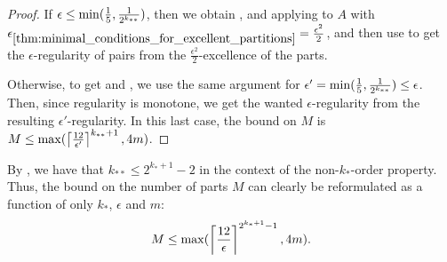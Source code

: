 \begin{theorem}
\begin{enumerate}
            \end{enumerate}
            \begin{proof}
                If $\epsilon \leq \min ( \frac{1}{5}, \frac{1}{2^{k_{**}}} )$, then we obtain ,
                 and  applying
                 to $A$ with
                $\epsilon_{\ref{thm:minimal_conditions_for_excellent_partitions}} = \frac{\epsilon^2}{2}$, and then use
                 to get the $\epsilon$-regularity of pairs from the $\frac{\epsilon^2}{2}$-excellence
                of the parts.

                Otherwise, to get  and ,
                we use the same argument for $\epsilon' = \min ( \frac{1}{5}, \frac{1}{2^{k_{**}}} ) \leq \epsilon$.
                Then, since regularity is monotone, we get the wanted $\epsilon$-regularity from the resulting $\epsilon'$-regularity.
                In this last case, the bound on $M$ is $M \leq \max ( \left\lceil \frac{12}{\epsilon'} \right\rceil^{k_{**}+1}, 4m )$.
            \end{proof}
        \end{theorem}

        \begin{remark}
            By , we have that $k_{**} \leq 2^{k_* + 1}-2$ in the context of the non-$k_*$-order
            property.
            Thus, the bound on the number of parts $M$ can clearly be reformulated as a function of only $k_*$, $\epsilon$ and $m$:
            \[
                M \leq \max ( \left\lceil \frac{12}{\epsilon} \right\rceil^{2^{k_* + 1}-1}, 4m ).
            \]
        \end{remark}




